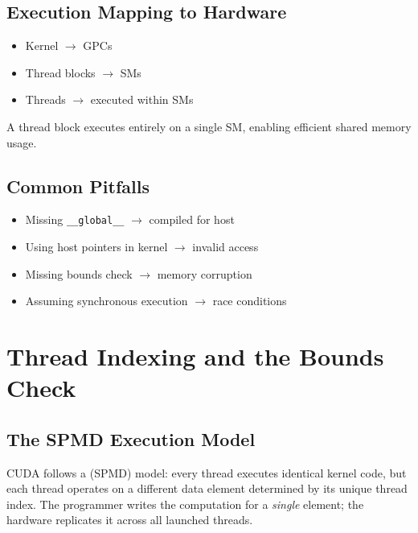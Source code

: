 \subsection{Execution Mapping to Hardware}

\begin{ppnote}
\begin{itemize}
    \item Kernel $\rightarrow$ GPCs
    \item Thread blocks $\rightarrow$ SMs
    \item Threads $\rightarrow$ executed within SMs
\end{itemize}

A thread block executes entirely on a single SM, enabling efficient shared memory usage.
\end{ppnote}

\subsection{Common Pitfalls}

\begin{pppitfall}
\begin{itemize}
    \item Missing \verb|__global__| $\rightarrow$ compiled for host
    \item Using host pointers in kernel $\rightarrow$ invalid access
    \item Missing bounds check $\rightarrow$ memory corruption
    \item Assuming synchronous execution $\rightarrow$ race conditions
\end{itemize}
\end{pppitfall}

\section{Thread Indexing and the Bounds Check}
\label{sec:thread-indexing}

\subsection{The SPMD Execution Model}
\label{ssec:spmd}

CUDA follows a  (SPMD) model: every
thread executes identical kernel code, but each thread operates on a different
data element determined by its unique thread index. The programmer writes the
computation for a \emph{single} element; the hardware replicates it across all
launched threads.

